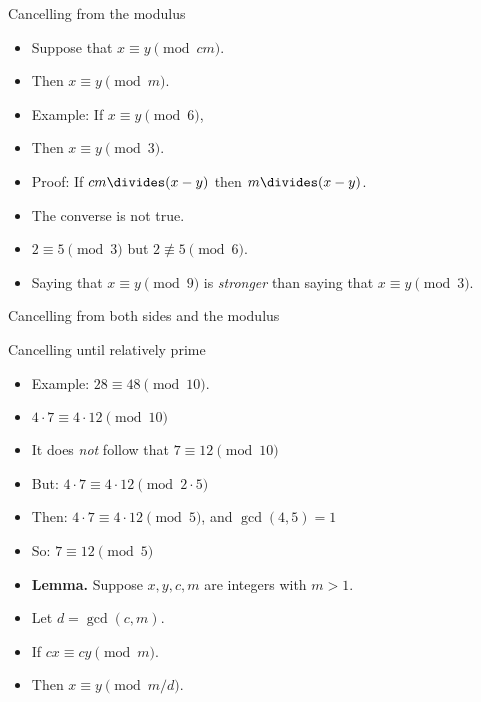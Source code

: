\documentclass[handout]{beamer}
\begin{document}
\begin{frame}{Cancelling from the modulus}
\begin{itemize}
  \item Suppose that $x\equiv y \pmod {cm}$.
  \item Then $x\equiv y \pmod m$.
  \item Example: If $x\equiv y \pmod 6$,
  \item Then $x\equiv y \pmod 3$.
  \item Proof: If $cm \divides (x-y)$ then $m\divides (x-y)$.
  \item The converse is not true.
  \item $2\equiv 5 \pmod 3$ but $2\not\equiv 5 \pmod 6$.
  \item Saying that $x\equiv y \pmod 9$ is \emph{stronger} than saying that $x\equiv y \pmod 3$.
\end{itemize}
\end{frame}

\begin{frame}{Cancelling from both sides and the modulus}
\end{frame}

\begin{frame}{Cancelling until relatively prime}
\begin{itemize}
  \item Example: $28  $.
  \item $4   $
  \item It does \emph{not} follow that $7  $
  \item But:  $4   $
  \item Then:  $4   $, and $\gcd(4,5) = 1$
  \item So:  $7  $
  \item \textbf{Lemma.} Suppose $x,y,c,m$ are integers with $m>1$.
  \item Let $d=\gcd(c,m)$.
  \item If $cx\equiv cy \pmod m$.
  \item Then $x\equiv y $.
\end{itemize}
\end{frame}
\end{document}
